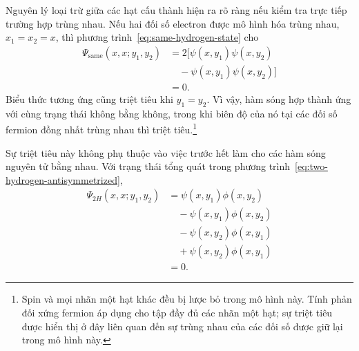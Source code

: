 Nguyên lý loại trừ giữa các hạt cấu thành hiện ra rõ ràng nếu kiểm tra trực tiếp trường hợp trùng nhau. Nếu hai đối số electron được mô hình hóa trùng nhau, \(x_1=x_2=x\), thì phương trình~\eqref{eq:same-hydrogen-state} cho
\begin{align}
\Psi_{\mathrm{same}}(x,x;y_1,y_2)
&=2\bigl[
\psi(x,y_1)\psi(x,y_2)\nonumber\\
&\quad{}-\psi(x,y_1)\psi(x,y_2)
\bigr]\\
&=0.
\end{align}
Biểu thức tương ứng cũng triệt tiêu khi \(y_1=y_2\). Vì vậy, hàm sóng hợp thành ứng với cùng trạng thái không bằng không, trong khi biên độ của nó tại các đối số fermion đồng nhất trùng nhau thì triệt tiêu.\footnote{Spin và mọi nhãn một hạt khác đều bị lược bỏ trong mô hình này. Tính phản đối xứng fermion áp dụng cho tập đầy đủ các nhãn một hạt; sự triệt tiêu được hiển thị ở đây liên quan đến sự trùng nhau của các đối số được giữ lại trong mô hình này.}

\begin{classroomqa}
\end{classroomqa}

\begin{classroomqa}
\end{classroomqa}

Sự triệt tiêu này không phụ thuộc vào việc trước hết làm cho các hàm sóng nguyên tử bằng nhau. Với trạng thái tổng quát trong phương trình~\eqref{eq:two-hydrogen-antisymmetrized},
\begin{align}
\Psi_{2H}(x,x;y_1,y_2)
&=\psi(x,y_1)\phi(x,y_2)\nonumber\\
&\quad{}-\psi(x,y_1)\phi(x,y_2)\nonumber\\
&\quad{}-\psi(x,y_2)\phi(x,y_1)\nonumber\\
&\quad{}+\psi(x,y_2)\phi(x,y_1)\\
&=0.
\end{align}

